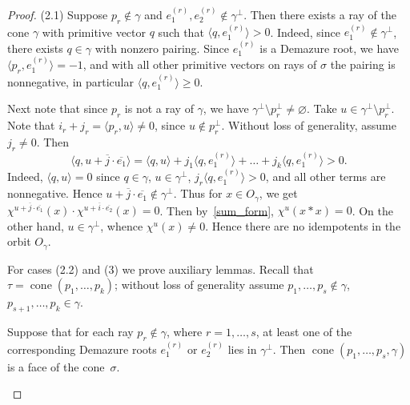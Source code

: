 \documentclass[10pt,a4paper]{amsart}
\DeclareMathOperator{\cone}{cone}
\newcommand{\ol}[1]{\overline{#1}}
\begin{document}
\begin{proof}
	\medskip
	
	(2.1) Suppose $p_r \notin \gamma$ and $e_1^{(r)}, e_2^{(r)} \notin \gamma^\perp$. Then there exists a ray of the cone $\gamma$ with primitive vector $q$ such that $\langle q, e_1^{(r)} \rangle > 0$. Indeed, since $e_1^{(r)}\notin \gamma^\perp$, there exists $q \in \gamma$ with nonzero pairing. Since $e_1^{(r)}$ is a Demazure root, we have $\langle p_r, e_1^{(r)} \rangle = -1$, and with all other primitive vectors on rays of $\sigma$ the pairing is nonnegative, in particular $\langle q, e_1^{(r)} \rangle \geq 0$.  

	Next note that since $p_r$ is not a ray of $\gamma$, we have $\gamma^\perp \setminus p_r^\perp \neq \varnothing$. Take $u \in \gamma^\perp \setminus p_r^\perp$. Note that $i_r + j_r = \langle p_r, u \rangle \neq 0$, since $u \notin p_r^\perp$. Without loss of generality, assume $j_r \neq 0$. Then \[\langle q, u + \ol{j} \cdot \ol{e_1} \rangle = \langle q, u \rangle + j_1 \langle q, e_1^{(r)} \rangle + \ldots + j_k\langle q, e_1^{(r)} \rangle > 0.\] Indeed, $\langle q, u \rangle = 0$ since $q \in \gamma$, $u \in \gamma^\perp$, $j_r \langle q, e_1^{(r)} \rangle > 0$, and all other terms are nonnegative. Hence $u + \ol{j} \cdot \ol{e_1} \notin \gamma^\perp$. Thus for $x \in O_\gamma$, we get $\chi^{u + \ol{j} \cdot \ol{e_1}}(x)\cdot \chi^{u + \ol{i} \cdot \ol{e_2}}(x) = 0$. Then by~\eqref{sum_form}, $\chi^u(x*x) = 0$. On the other hand, $u \in \gamma^\perp$, whence $\chi^u(x) \neq 0$. Hence there are no idempotents in the orbit $O_\gamma$. 
	
	\bigskip
	
	For cases (2.2) and (3) we prove auxiliary lemmas. Recall that $\tau = \cone(p_1, \ldots, p_k)$; without loss of generality assume ${p_1, \ldots, p_s \notin \gamma}$, ${p_{s+1}, \ldots, p_k \in \gamma}$. 
	
	\begin{lemma}\label{lm:cone}
		Suppose that for each ray $p_r \notin \gamma$, where $r = 1, \ldots, s$, at least one of the corresponding Demazure roots $e_1^{(r)}$ or $e_2^{(r)}$ lies in $\gamma^\perp$. Then $\cone(p_1, \ldots, p_s, \gamma)$ is a face of the cone~$\sigma$.
	\end{lemma}
	

\end{proof}
\end{document}
